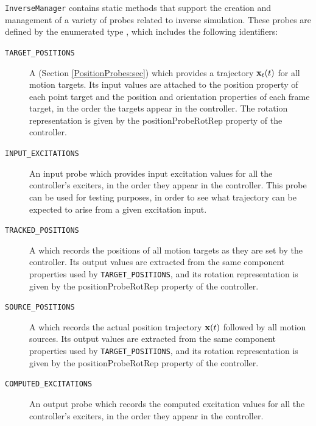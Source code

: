 {\tt InverseManager} contains static methods that support the creation and
management of a variety of probes related to inverse simulation. These probes
are defined by the enumerated type
,
which includes the following identifiers:

\begin{description}

\item[{\tt TARGET\_POSITIONS}]\mbox{}

A  (Section \ref{PositionProbes:sec})
which provides a trajectory ${\bf x}_t(t)$ for all motion targets. Its input values
are attached to the {\sf position} property of each point target and the {\sf
position} and {\sf orientation} properties of each frame target, in the order
the targets appear in the controller. The rotation representation is given by
the {\sf positionProbeRotRep} property of the controller.

\item[{\tt INPUT\_EXCITATIONS}]\mbox{}

An input probe which provides input excitation values for all the controller's
exciters, in the order they appear in the controller. This probe can be used
for testing purposes, in order to see what trajectory can be expected to arise
from a given excitation input.

\item[{\tt TRACKED\_POSITIONS}]\mbox{}

A  which records the positions of all
motion targets as they are set by the controller. Its output values are
extracted from the same component properties used by {\tt TARGET\_POSITIONS},
and its rotation representation is given by the {\sf positionProbeRotRep}
property of the controller.

\item[{\tt SOURCE\_POSITIONS}]\mbox{}

A  which records the actual position
trajectory ${\bf x}(t)$ followed by all motion sources. Its output values are
extracted from the same component properties used by {\tt TARGET\_POSITIONS},
and its rotation representation is given by the {\sf positionProbeRotRep}
property of the controller.

\item[{\tt COMPUTED\_EXCITATIONS}]\mbox{}

An output probe which records the computed excitation values for all the
controller's exciters, in the order they appear in the controller.

\end{description}

